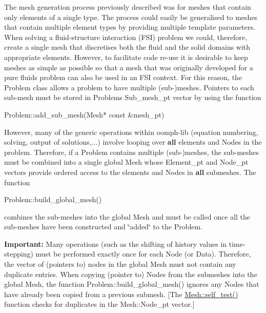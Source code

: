 The mesh generation process previously described was for meshes that contain only elements of a single type. The process could easily be generalised to meshes that contain multiple element types by providing multiple template parameters. When solving a fluid-\/structure interaction (F\+SI) problem we could, therefore, create a single mesh that discretises both the fluid and the solid domains with appropriate elements. However, to facilitate code re-\/use it is desirable to keep meshes as simple as possible so that a mesh that was originally developed for a pure fluids problem can also be used in an F\+SI context. For this reason, the {\ttfamily Problem} class allows a problem to have multiple (sub-\/)meshes. Pointers to each sub-\/mesh must be stored in Problem\textquotesingle{}s {\ttfamily Sub\+\_\+mesh\+\_\+pt} vector by using the function 
\begin{DoxyCode}
Problem::add\_sub\_mesh(Mesh* \textcolor{keyword}{const} &mesh\_pt) 
\end{DoxyCode}
 However, many of the generic operations within {\ttfamily oomph-\/lib} (equation numbering, solving, output of solutions,...) involve looping over {\bfseries all} elements and {\ttfamily Nodes} in the problem. Therefore, if a {\ttfamily Problem} contains multiple (sub-\/)meshes, the sub-\/meshes must be combined into a single global {\ttfamily Mesh} whose {\ttfamily Element\+\_\+pt} and {\ttfamily Node\+\_\+pt} vectors provide ordered access to the elements and {\ttfamily Nodes} in {\bfseries all} submeshes. The function 
\begin{DoxyCode}
Problem::build\_global\_mesh() 
\end{DoxyCode}
 combines the sub-\/meshes into the global {\ttfamily Mesh} and must be called once all the sub-\/meshes have been constructed and \char`\"{}added\char`\"{} to the {\ttfamily Problem}.

{\bfseries Important\+:} Many operations (such as the shifting of history values in time-\/stepping) must be performed exactly once for each {\ttfamily Node} (or {\ttfamily Data}). Therefore, the vector of (pointers to) nodes in the global {\ttfamily Mesh} must not contain any duplicate entries. When copying (pointer to) {\ttfamily Nodes} from the submeshes into the global {\ttfamily Mesh}, the function {\ttfamily Problem\+::build\+\_\+global\+\_\+mesh()} ignores any {\ttfamily Nodes} that have already been copied from a previous submesh. \mbox{[}The {\ttfamily \hyperlink{namespaceoomph_a6a5cfce839009bef49cce08492ec6aeb}{Mesh\+::self\+\_\+test()}} function checks for duplicates in the {\ttfamily Mesh\+::\+Node\+\_\+pt} vector.\mbox{]}

